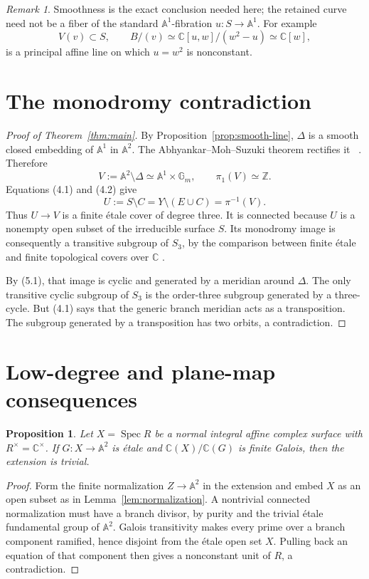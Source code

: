 \documentclass[11pt]{article}
\newtheorem{proposition}[theorem]{Proposition}
\theoremstyle{definition}
\theoremstyle{remark}
\newtheorem{remark}[theorem]{Remark}
\newcommand{\A}{\mathbb A}
\newcommand{\C}{\mathbb C}
\newcommand{\Z}{\mathbb Z}
\newcommand{\Gm}{\mathbb G_m}
\newcommand{\Spec}{\operatorname{Spec}}
\begin{document}
\begin{remark}
Smoothness is the exact conclusion needed here; the retained curve need
not be a fiber of the standard \(\A^1\)-fibration
\(u:S\to\A^1\).  For example
\[
 V(v)\subset S,\qquad
 B/(v)\simeq\C[u,w]/(w^2-u)\simeq\C[w],
\]
is a principal affine line on which \(u=w^2\) is nonconstant.
\end{remark}

\section{The monodromy contradiction}

\begin{proof}[Proof of Theorem~\ref{thm:main}]
By Proposition~\ref{prop:smooth-line}, \(\Delta\) is a smooth closed
embedding of \(\A^1\) in \(\A^2\).  The
Abhyankar--Moh--Suzuki theorem rectifies it
~\cite{AbhyankarMoh,Suzuki}.  Therefore
\[
 V:=\A^2\setminus\Delta\simeq\A^1\times\Gm,
\qquad \pi_1(V)\simeq\Z.
\tag{5.1}
\]
Equations (4.1) and (4.2) give
\[
 U:=S\setminus C
 =Y\setminus(E\cup C)
 =\pi^{-1}(V).
\]
Thus \(U\to V\) is a finite \'etale cover of degree three.  It is
connected because \(U\) is a nonempty open subset of the irreducible
surface \(S\).  Its monodromy image is consequently a transitive
subgroup of \(S_3\), by the comparison between finite \'etale and
finite topological covers over \(\C\)
\cite[Expos\'e XII]{SGA1}.

By (5.1), that image is cyclic and generated by a meridian around
\(\Delta\).  The only transitive cyclic subgroup of \(S_3\) is the
order-three subgroup generated by a three-cycle.  But (4.1) says that
the generic branch meridian acts as a transposition.  The subgroup
generated by a transposition has two orbits, a contradiction.
\end{proof}

\section{Low-degree and plane-map consequences}

\begin{proposition}\label{prop:galois}
Let \(X=\Spec R\) be a normal integral affine complex surface with
\(R^\times=\C^\times\).  If \(G:X\to\A^2\) is \'etale and
\(\C(X)/\C(G)\) is finite Galois, then the extension is trivial.
\end{proposition}

\begin{proof}
Form the finite normalization \(Z\to\A^2\) in the extension and embed
\(X\) as an open subset as in Lemma~\ref{lem:normalization}.  A
nontrivial connected normalization must have a branch divisor, by
purity and the trivial \'etale fundamental group of \(\A^2\).  Galois
transitivity makes every prime over a branch component ramified, hence
disjoint from the \'etale open set \(X\).  Pulling back an equation of
that component then gives a nonconstant unit of \(R\), a contradiction.
\end{proof}
\end{document}
